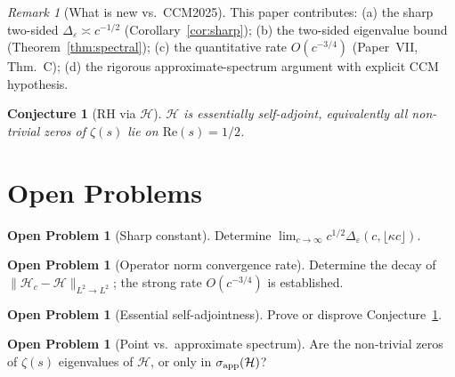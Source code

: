 \documentclass[12pt,a4paper]{amsart}
\newtheorem{conjecture}[theorem]{Conjecture}
\theoremstyle{definition}
\newtheorem{problem}[theorem]{Open Problem}
\theoremstyle{remark}
\newtheorem{remark}[theorem]{Remark}
\newcommand{\Hc}{\mathcal{H}_c}
\newcommand{\Hlim}{\mathcal{H}}
\begin{document}
\begin{remark}[What is new vs.\ CCM2025]
This paper contributes:
(a) the sharp two-sided
$\Delta_\varepsilon\asymp c^{-1/2}$
(Corollary~\ref{cor:sharp});
(b) the two-sided eigenvalue bound
(Theorem~\ref{thm:spectral});
(c) the quantitative rate $O(c^{-3/4})$
(Paper~VII, Thm.~C);
(d) the rigorous approximate-spectrum
argument with explicit CCM hypothesis.
\end{remark}

\begin{conjecture}[RH via $\Hlim$]
\label{conj:RH}
$\Hlim$ is essentially self-adjoint,
equivalently all non-trivial zeros of $\zeta(s)$
lie on $\mathrm{Re}(s)=1/2$.
\end{conjecture}

\section{Open Problems}
\label{sec:problems}

\begin{problem}[Sharp constant]
Determine
$\lim_{c\to\infty}c^{1/2}\Delta_\varepsilon
(c,\lfloor\kappa c\rfloor)$.
\end{problem}

\begin{problem}[Operator norm convergence rate]
Determine the decay of $\|\Hc-\Hlim\|_{L^2\to L^2}$;
the strong rate $O(c^{-3/4})$ is established.
\end{problem}

\begin{problem}[Essential self-adjointness]
Prove or disprove Conjecture~\ref{conj:RH}.
\end{problem}

\begin{problem}[Point vs.\ approximate spectrum]
Are the non-trivial zeros of $\zeta(s)$
eigenvalues of $\Hlim$, or only in
$\sigma_{\rm app}(\Hlim)$?
\end{problem}
\end{document}
